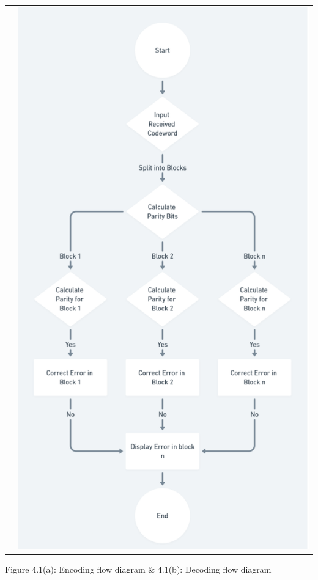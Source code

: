 \documentclass{article}
\numberwithin{equation}{section}
\numberwithin{figure}{section}
\numberwithin{table}{section}
\begin{document}
\begin{tabular}{cc}
       &
       \includegraphics[scale=0.6]{decoding.png}\\
\end{tabular}

\centerline{Figure 4.1(a): Encoding flow diagram \& 4.1(b): Decoding flow diagram}
   
\end{document}
